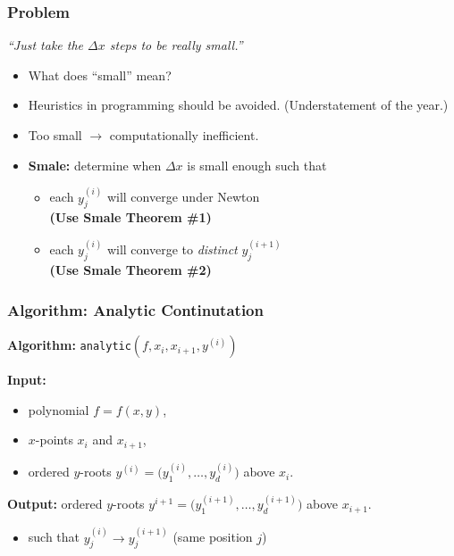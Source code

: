 \documentclass{beamer}
\begin{document}
\begin{frame}
  \frametitle{Problem}

  {\it ``Just take the $\Delta x$ steps to be really small.''}

  \pause

  \vspace{16pt}

  \begin{itemize}
  \item<2-> What does ``small'' mean?
  \item<3-> Heuristics in programming should be avoided. (Understatement of the
    year.)
  \item<4-> Too small $\to$ computationally inefficient.
  \item<5-> {\bf Smale:} determine when $\Delta x$ is small enough such
    that
    \begin{itemize}
    \item<6-> each $y_j^{(i)}$ will converge under Newton \\
      {\bf (Use Smale Theorem \#1)}
    \item<7-> each $y_j^{(i)}$ will converge to {\it distinct}
      $y_j^{(i+1)}$ \\
      {\bf (Use Smale Theorem \#2)}
    \end{itemize}
  \end{itemize}
\end{frame}



\begin{frame}
  \frametitle{Algorithm: Analytic Continutation}

  {\bf Algorithm:} {\tt analytic}$(f,x_i,x_{i+1},y^{(i)})$ \\

  \pause

  {\bf Input:}
  \begin{itemize}
  \item polynomial $f = f(x,y)$,
  \item $x$-points $x_i$ and $x_{i+1}$,
  \item ordered $y$-roots $y^{(i)} = \big( y_1^{(i)}, \ldots, y_d^{(i)}
    \big)$ above $x_i$.
  \end{itemize}

  \pause

  {\bf Output:} ordered $y$-roots $y^{i+1} = \big( y_1^{(i+1)}, \ldots,
  y_d^{(i+1)} \big)$ above $x_{i+1}$.

  \begin{itemize}
    \item such that $y_j^{(i)} \to y_j^{(i+1)}$ (same position $j$)
  \end{itemize}
\end{frame}
\end{document}
